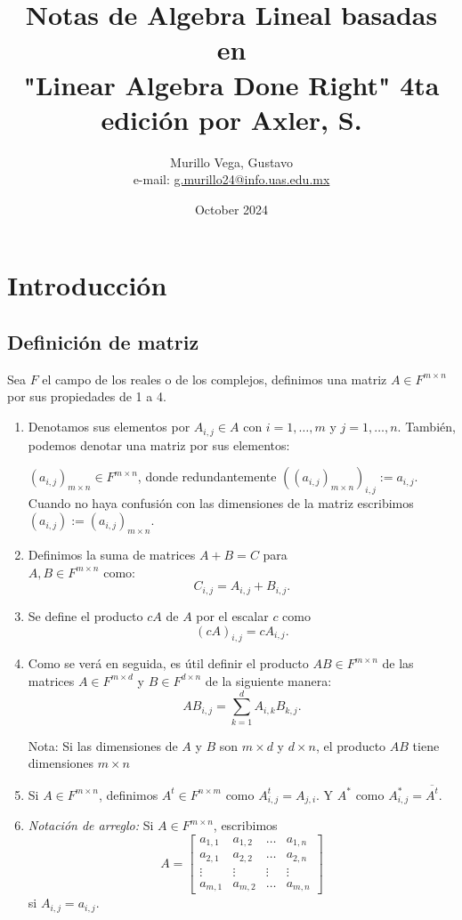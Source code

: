 \documentclass{article}
\title{Notas de Algebra Lineal basadas en\\"Linear Algebra Done Right" 4ta edición por Axler, S.}
\author{Murillo Vega, Gustavo \\ e-mail:
\href{mailto:g.murillo24@info.uas.edu.mx}{g.murillo24@info.uas.edu.mx}}
\date{October 2024}
\begin{document}
\maketitle

\section{Introducción}
\subsection{Definición de matriz}
Sea ${F}$ el campo de los reales o de los complejos, definimos una matriz $A\in {F}^{m\times n}$ por sus propiedades de 1 a 4.
\begin{enumerate}
    \item Denotamos sus elementos por $A_{i,j}\in A$ con  $i=1,\ldots,m$ y $j=1,\ldots,n$. También, podemos denotar una matriz por sus elementos:
    
    $(a_{i,j})_{m\times n} \in {F}^{m\times n}$, donde redundantemente $((a_{i,j})_{m\times n})_{i,j} := a_{i,j}$.\\
    Cuando no haya confusión con las dimensiones de la matriz
    escribimos\\ $(a_{i,j}) := (a_{i,j})_{m\times n}$.
    
    \item Definimos la suma de matrices $A+B = C$ para
    \\ $A, B \in {F}^{m\times n}$ como:
    $$C_{i,j}=A_{i,j} + B_{i,j}.$$

    \item Se define el producto $cA$ de $A$ por el escalar $c$
    como $$(cA)_{i,j} = cA_{i,j}.$$
    
    \item Como se verá en seguida, es útil definir el producto
    $AB\in {F}^{m\times n}$ de las matrices $A\in {F}^{m\times d}$ y
    $B \in {F}^{d\times n}$ de la siguiente manera:
    $$AB_{i,j} = \sum^d_{k=1} A_{i,k} B_{k,j}.$$
    
    Nota: Si las dimensiones de $A$ y $B$ son $m\times d$
    y $d\times n$, el producto $AB$ tiene dimensiones $m\times n$

    \item Si $A\in F^{m\times n}$, definimos $A^t \in F^{n\times m}$
    como $A^t_{i,j} = A_{j,i}$. Y $A^*$ como
    $A^*_{i,j} = \overline{A^t}$.

    \item \textit{Notación de arreglo:} Si
    $A\in {F}^{m\times n}$, escribimos
    $$A = \begin{bmatrix}
        a_{1,1} & a_{1,2} & \ldots & a_{1, n} \\
        a_{2,1} & a_{2,2} & \ldots & a_{2, n} \\
        \vdots & \vdots & \vdots & \vdots \\
        a_{m,1} & a_{m,2} & \ldots & a_{m, n}
    \end{bmatrix}$$
    si $A_{i,j} = a_{i,j}$.
\end{enumerate}
\end{document}
